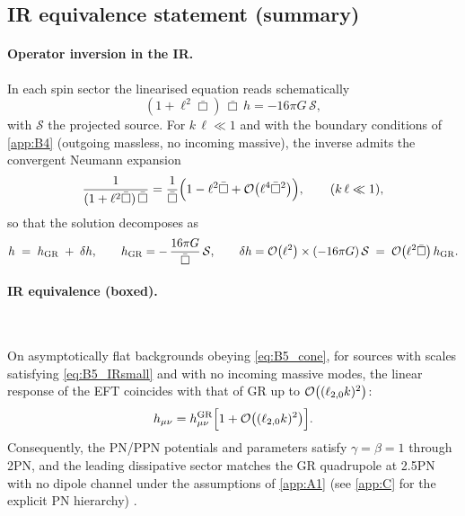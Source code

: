 \documentclass{iopjournal}
\begin{document}
\subsection{IR equivalence statement (summary)}\label{app:B6}
\paragraph{Operator inversion in the IR.}
In each spin sector the linearised equation reads schematically
\begin{equation}
(1+\ell^2\bar\Box)\,\bar\Box\,h = -16\pi G\,\mathcal{S},
\label{eq:B6_sector}
\end{equation}
with $\mathcal{S}$ the projected source. For $k\,\ell\ll1$ and with the boundary conditions of \cref{app:B4} (outgoing massless, no incoming massive), the inverse admits the convergent Neumann expansion
\begin{equation}
\frac{1}{(1+\ell^2\bar\Box)\,\bar\Box}
=\frac{1}{\bar\Box}\Big(1-\ell^2\bar\Box+\order{\ell^4\bar\Box^2}\Big),
\qquad (k\,\ell\ll1),
\label{eq:B6_Neumann}
\end{equation}
so that the solution decomposes as
\begin{equation}
h\;=\;h_{\rm GR}\;+\;\delta h,
\qquad
h_{\rm GR}=-\,\frac{16\pi G}{\bar\Box}\,\mathcal{S},
\qquad
\delta h=\order{\ell^2}\times(-16\pi G)\,\mathcal{S}\;=\;\order{\ell^2\bar\Box}\,h_{\rm GR}.
\label{eq:B6_split}
\end{equation}

\paragraph{IR equivalence (boxed).}\

\begin{conceptbox}
	On asymptotically flat backgrounds obeying \eqref{eq:B5_cone}, for sources with scales satisfying \eqref{eq:B5_IRsmall} and with no incoming massive modes, the linear response of the EFT coincides with that of GR up to $\order{(\ell_{2,0}k)^2}$:
\[
h_{\mu\nu}=h^{\rm GR}_{\mu\nu}\Big[1+\order{(\ell_{2,0}k)^2}\Big].
\]
Consequently, the PN/PPN potentials and parameters satisfy $\gamma=\beta=1$ through 2PN, and the leading dissipative sector matches the GR quadrupole at 2.5PN with no dipole channel under the assumptions of \cref{app:A1} (see \cref{app:C} for the explicit PN hierarchy) \cite{PoissonWill2014,Will2014LRR,Blanchet2014LRR}.
	
\end{conceptbox}
\end{document}
